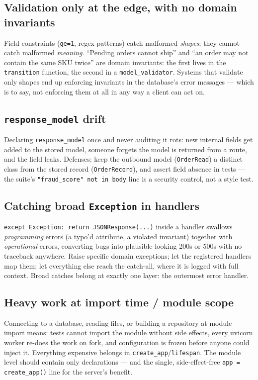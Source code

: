 \subsection*{Validation only at the edge, with no domain invariants}
Field constraints (\texttt{ge=1}, regex patterns) catch malformed
\emph{shapes}; they cannot catch malformed \emph{meaning}. ``Pending orders
cannot ship'' and ``an order may not contain the same SKU twice'' are domain
invariants: the first lives in the \texttt{transition} function, the second
in a \texttt{model\_validator}. Systems that validate only shapes end up
enforcing invariants in the database's error messages --- which is to say,
not enforcing them at all in any way a client can act on.

\subsection*{\texttt{response\_model} drift}
Declaring \texttt{response\_model} once and never auditing it rots: new
internal fields get added to the stored model, someone forgets the model is
returned from a route, and the field leaks. Defenses: keep the outbound
model (\texttt{OrderRead}) a distinct class from the stored record
(\texttt{OrderRecord}), and assert field absence in tests --- the suite's
\texttt{"fraud\_score" not in body} line is a security control, not a style
test.

\subsection*{Catching broad \texttt{Exception} in handlers}
\texttt{except Exception: return JSONResponse(...)} inside a handler swallows
\emph{programming} errors (a typo'd attribute, a violated invariant) together
with \emph{operational} errors, converting bugs into plausible-looking 200s
or 500s with no traceback anywhere. Raise specific domain exceptions; let the
registered handlers map them; let everything else reach the catch-all, where
it is logged with full context. Broad catches belong at exactly one layer:
the outermost error handler.

\subsection*{Heavy work at import time / module scope}
Connecting to a database, reading files, or building a repository at module
import means: tests cannot import the module without side effects, every
uvicorn worker re-does the work on fork, and configuration is frozen before
anyone could inject it. Everything expensive belongs in
\texttt{create\_app}/\texttt{lifespan}. The module level should contain only
declarations --- and the single, side-effect-free
\texttt{app = create\_app()} line for the server's benefit.

